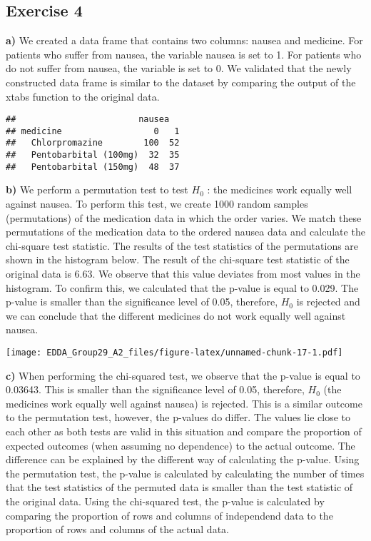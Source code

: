 \documentclass[]{article}
\begin{document}
\hypertarget{exercise-4}{%
\subsection{Exercise 4}\label{exercise-4}}

\textbf{a)} We created a data frame that contains two columns: nausea
and medicine. For patients who suffer from nausea, the variable nausea
is set to 1. For patients who do not suffer from nausea, the variable is
set to 0. We validated that the newly constructed data frame is similar
to the dataset by comparing the output of the xtabs function to the
original data.

\begin{verbatim}
##                        nausea
## medicine                  0   1
##   Chlorpromazine        100  52
##   Pentobarbital (100mg)  32  35
##   Pentobarbital (150mg)  48  37
\end{verbatim}

\textbf{b)} We perform a permutation test to test \(H_0\) : the
medicines work equally well against nausea. To perform this test, we
create 1000 random samples (permutations) of the medication data in
which the order varies. We match these permutations of the medication
data to the ordered nausea data and calculate the chi-square test
statistic. The results of the test statistics of the permutations are
shown in the histogram below. The result of the chi-square test
statistic of the original data is 6.63. We observe that this value
deviates from most values in the histogram. To confirm this, we
calculated that the p-value is equal to 0.029. The p-value is smaller
than the significance level of 0.05, therefore, \(H_0\) is rejected and
we can conclude that the different medicines do not work equally well
against nausea.

\texttt{[image: EDDA\_Group29\_A2\_files/figure-latex/unnamed-chunk-17-1.pdf]}

\textbf{c)} When performing the chi-squared test, we observe that the
p-value is equal to 0.03643. This is smaller than the significance level
of 0.05, therefore, \(H_0\) (the medicines work equally well against
nausea) is rejected. This is a similar outcome to the permutation test,
however, the p-values do differ. The values lie close to each other as
both tests are valid in this situation and compare the proportion of
expected outcomes (when assuming no dependence) to the actual outcome.
The difference can be explained by the different way of calculating the
p-value. Using the permutation test, the p-value is calculated by
calculating the number of times that the test statistics of the permuted
data is smaller than the test statistic of the original data. Using the
chi-squared test, the p-value is calculated by comparing the proportion
of rows and columns of independend data to the proportion of rows and
columns of the actual data.
\end{document}
